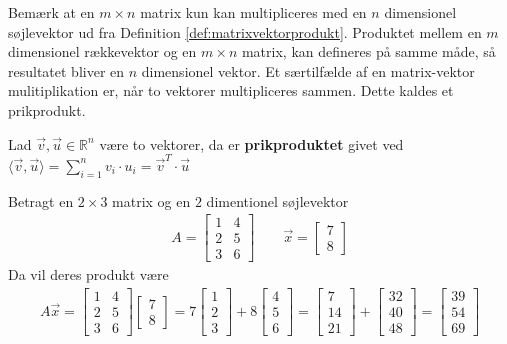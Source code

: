 Bemærk at en $m \times n$ matrix kun kan multipliceres med en $n$ dimensionel søjlevektor ud fra Definition \ref{def:matrixvektorprodukt}. Produktet mellem en $m$ dimensionel rækkevektor og en $m \times n$ matrix, kan defineres på samme måde, så resultatet bliver en $n$ dimensionel vektor. 
Et særtilfælde af en matrix-vektor mulitiplikation er, når to vektorer multipliceres sammen. Dette kaldes et prikprodukt.
\begin{defn}[Prikproduktet]
Lad $\vec{v}, \vec{u} \in \mathds{R}^n$ være to vektorer, da er \textbf{prikproduktet} givet ved $\langle\vec{v},\vec{u}\rangle = \sum_{i=1}^n v_i \cdot u_i = \vec{v}^T \cdot \vec{u} $
\end{defn}
\begin{eks}
Betragt en $2 \times 3$ matrix og en $2$ dimentionel søjlevektor
\begin{align*}
A=
\begin{bmatrix}
1 & 4\\
2 & 5\\
3 & 6
\end{bmatrix}
\qquad
\vec{x}=
\begin{bmatrix}
7\\
8
\end{bmatrix}
\end{align*}
Da vil deres produkt være
\begin{align*}
A\vec{x}= \begin{bmatrix}
1 & 4\\
2 & 5\\
3 & 6
\end{bmatrix}
\begin{bmatrix}
7\\
8
\end{bmatrix}
=
7
\begin{bmatrix}
1\\
2\\
3
\end{bmatrix}
+ 8
\begin{bmatrix}
4\\
5\\
6
\end{bmatrix}=
\begin{bmatrix}
7\\
14\\
21
\end{bmatrix}
+
\begin{bmatrix}
32\\
40\\
48
\end{bmatrix}
=
\begin{bmatrix}
39\\
54\\
69
\end{bmatrix}
\end{align*}
\end{eks}
